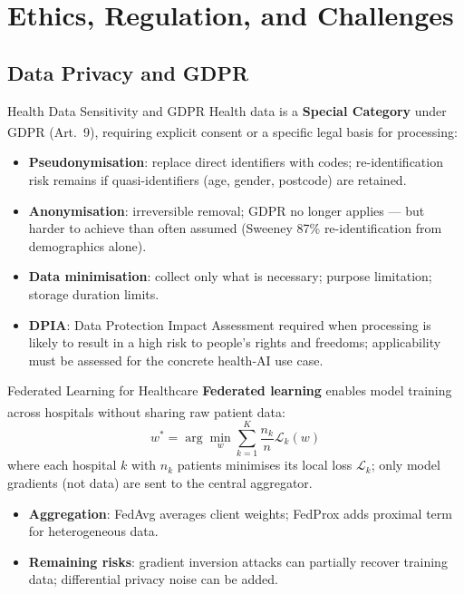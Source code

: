 \section{Ethics, Regulation, and Challenges}

\subsection{Data Privacy and GDPR}

\begin{v3topic}{Health Data Sensitivity and GDPR}
    Health data is a \textbf{Special Category} under GDPR (Art.~9), requiring explicit consent or a specific legal basis for processing\textsuperscript{\cite[][pp.~89--110]{itgovernanceprivacyteamEUGDPR2020}}:
    \begin{itemize}
        \item \textbf{Pseudonymisation}: replace direct identifiers with codes; re-identification risk remains if quasi-identifiers (age, gender, postcode) are retained.
        \item \textbf{Anonymisation}: irreversible removal; GDPR no longer applies — but harder to achieve than often assumed (Sweeney 87\% re-identification from demographics alone).
        \item \textbf{Data minimisation}: collect only what is necessary; purpose limitation; storage duration limits.
        \item \textbf{DPIA}: Data Protection Impact Assessment required when processing is likely to result in a high risk to people's rights and freedoms; applicability must be assessed for the concrete health-AI use case.
    \end{itemize}

\end{v3topic}
\begin{v3topic}{Federated Learning for Healthcare}
    \textbf{Federated learning} enables model training across hospitals without sharing raw patient data\textsuperscript{\cite[][p.~51]{liTwoDecadesFederated2020}}:
    \begin{equation}
        w^* = \arg\min_w \sum_{k=1}^{K} \frac{n_k}{n} \mathcal{L}_k(w)
    \end{equation}
    where each hospital $k$ with $n_k$ patients minimises its local loss $\mathcal{L}_k$; only model gradients (not data) are sent to the central aggregator.
    \begin{itemize}
        \item \textbf{Aggregation}: FedAvg averages client weights; FedProx adds proximal term for heterogeneous data.
        \item \textbf{Remaining risks}: gradient inversion attacks can partially recover training data; differential privacy noise can be added.
    \end{itemize}

\end{v3topic}
